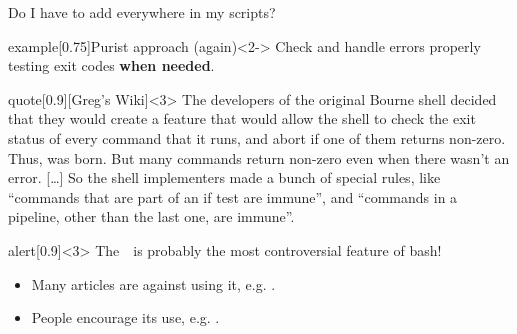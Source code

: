 \begin{frame}{Do I have to add \;\; everywhere in my scripts?}
    \vspace{-3mm}
    \begin{varblock}{example}[0.75\textwidth]{Purist approach (again)}<2->
        Check and handle errors properly testing exit codes \textbf{when needed}.
    \end{varblock}
    \begin{varblock}{quote}[0.9\textwidth]{}[Greg's Wiki]<3>
        The developers of the original Bourne shell decided that they would create a feature that would allow the shell to check the exit status of every command that it runs, and abort if one of them returns non-zero.
        Thus,  was born.
        But many commands return non-zero even when there wasn't an error.
        [\ldots]
        So the shell implementers made a bunch of special rules, like ``commands that are part of an if test are immune'', and ``commands in a pipeline, other than the last one, are immune''.
    \end{varblock}
    \begin{varblock}{alert}[0.9\textwidth]{}<3>
        \alert{The \,\, is probably the most controversial feature of bash!}
    \end{varblock}
    \begin{itemize}[<3>]
        \item Many articles are against using it, e.g. .
        \item People encourage its use, e.g. .
    \end{itemize}
\end{frame}

